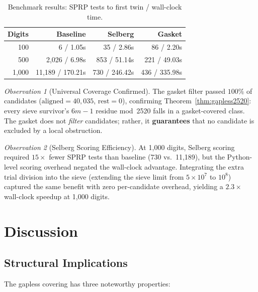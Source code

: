 \documentclass[12pt,a4paper]{article}
\theoremstyle{remark}
\newtheorem{observation}{Observation}
\begin{document}
\begin{table}[h]
\centering
\caption{Benchmark results: SPRP tests to first twin / wall-clock time.}
\label{tab:benchmark}
\begin{tabular}{rrrr}
\toprule
\textbf{Digits} & \textbf{Baseline} & \textbf{Selberg} & \textbf{Gasket} \\
\midrule
100 & 6 / 1.05s & 35 / 2.86s & 86 / 2.20s \\
500 & 2{,}026 / 6.98s & 853 / 51.14s & 221 / 49.03s \\
1{,}000 & 11{,}189 / 170.21s & 730 / 246.42s & 436 / 335.98s \\
\bottomrule
\end{tabular}
\end{table}

\begin{observation}[Universal Coverage Confirmed]
The gasket filter passed $100\%$ of candidates
($\text{aligned} = 40{,}035$, $\text{rest} = 0$), confirming
Theorem~\ref{thm:gapless2520}: every sieve survivor's $6m{-}1$ residue
mod~2520 falls in a gasket-covered class. The gasket does not \emph{filter}
candidates; rather, it \textbf{guarantees} that no candidate is excluded
by a local obstruction.
\end{observation}

\begin{observation}[Selberg Scoring Efficiency]
At 1{,}000 digits, Selberg scoring required $15\times$ fewer SPRP tests
than baseline (730 vs.\ 11{,}189), but the Python-level scoring overhead
negated the wall-clock advantage.  Integrating the extra trial division
into the sieve (extending the sieve limit from $5\times 10^7$ to $10^8$)
captured the same benefit with zero per-candidate overhead, yielding a
$2.3\times$ wall-clock speedup at 1{,}000 digits.
\end{observation}

\section{Discussion}

\subsection{Structural Implications}

The gapless covering has three noteworthy properties:
\end{document}
